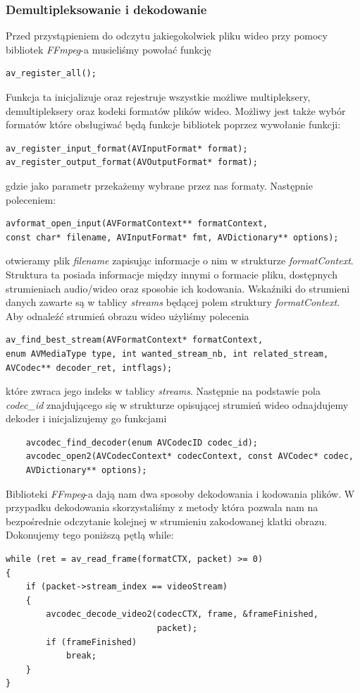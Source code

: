 \documentclass[twoside]{projektInzynierskiMS}
\begin{document}
\subsubsection{Demultipleksowanie i dekodowanie}
Przed przystąpieniem do odczytu jakiegokolwiek pliku wideo przy pomocy bibliotek \emph{FFmpeg}-a musieliśmy powołać funkcję 
\begin{verbatim}
av_register_all();
\end{verbatim}
Funkcja ta inicjalizuje oraz rejestruje wszystkie możliwe multipleksery, demultipleksery oraz kodeki formatów plików wideo. Możliwy jest także wybór formatów które obsługiwać będą funkcje bibliotek poprzez wywołanie funkcji:
\begin{verbatim}
av_register_input_format(AVInputFormat* format);
av_register_output_format(AVOutputFormat* format);
\end{verbatim}
gdzie jako parametr przekażemy wybrane przez nas formaty. Następnie poleceniem: 
\begin{verbatim}
avformat_open_input(AVFormatContext** formatContext, 
const char* filename, AVInputFormat* fmt, AVDictionary** options);	
\end{verbatim}
otwieramy plik \emph{filename} zapisując informacje o nim w strukturze \emph{formatContext}. Struktura ta posiada informacje między innymi o formacie pliku, dostępnych strumieniach audio/wideo oraz sposobie ich kodowania. Wskaźniki do strumieni danych zawarte są w tablicy \emph{streams} będącej polem struktury \emph{formatContext}. Aby odnaleźć strumień obrazu wideo użyliśmy polecenia
\begin{verbatim}
av_find_best_stream(AVFormatContext* formatContext, 
enum AVMediaType type, int wanted_stream_nb, int related_stream, 
AVCodec** decoder_ret, intflags);
\end{verbatim}
które zwraca jego indeks w tablicy \emph{streams}. Następnie na podstawie pola \emph{codec\_id} znajdującego się w strukturze opisującej strumień wideo odnajdujemy dekoder i inicjalizujemy go funkcjami 
\begin{verbatim}
	avcodec_find_decoder(enum AVCodecID codec_id);
	avcodec_open2(AVCodecContext* codecContext, const AVCodec* codec, 
	AVDictionary** options);
\end{verbatim}
Biblioteki \emph{FFmpeg}-a dają nam dwa sposoby dekodowania i kodowania plików. W przypadku dekodowania skorzystaliśmy z metody która pozwala nam na bezpośrednie odczytanie kolejnej w strumieniu zakodowanej klatki obrazu. Dokonujemy tego poniższą pętlą while: 
\begin{verbatim}
while (ret = av_read_frame(formatCTX, packet) >= 0) 
{
    if (packet->stream_index == videoStream) 
    {
        avcodec_decode_video2(codecCTX, frame, &frameFinished, 
                              packet);
        if (frameFinished)
            break;
    }
}
\end{verbatim}
\end{document}
